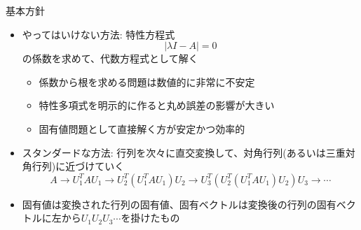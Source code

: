\begin{frame}[t,fragile]{基本方針}
  \begin{itemize}
  \item やってはいけない方法: 特性方程式
    \[
    |\lambda I - A| = 0
    \]
    の係数を求めて、代数方程式として解く
    \begin{itemize}
    \item 係数から根を求める問題は数値的に非常に不安定
    \item 特性多項式を明示的に作ると丸め誤差の影響が大きい
    \item 固有値問題として直接解く方が安定かつ効率的
    \end{itemize}
  \item スタンダードな方法: 行列を次々に直交変換して、対角行列(あるいは三重対角行列)に近づけていく
    \[
    A \rightarrow U_1^T A U_1 \rightarrow U_2^T (U_1^T A U_1) U_2 \rightarrow U_3^T (U_2^T (U_1^T A U_1) U_2) U_3 \rightarrow \cdots
    \]
  \item 固有値は変換された行列の固有値、固有ベクトルは変換後の行列の固有ベクトルに左から$U_1 U_2 U_3 \cdots$を掛けたもの
  \end{itemize}
\end{frame}
